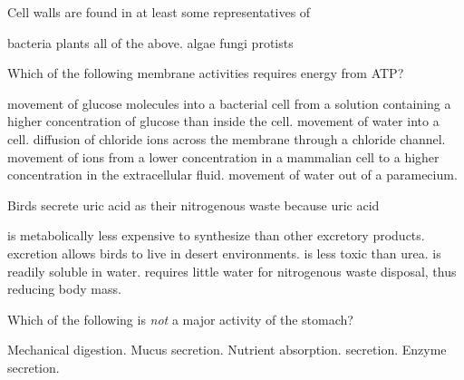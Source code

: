\question
Cell walls are found in at least some representatives of  
\begin{choices}
\choice bacteria 
\choice plants 
\correctchoice all of the above.  
\choice algae 
\choice fungi 
\choice protists 
\end{choices}

\question
Which of the following membrane activities requires energy from ATP?

\begin{choices}
\choice movement of glucose molecules into a bacterial cell from a solution containing a higher concentration of glucose than inside the cell. 
\choice movement of water into a cell. 
\choice diffusion of chloride ions across the membrane through a chloride channel. 
\correctchoice movement of  ions from a lower concentration in a mammalian cell to a higher concentration in the extracellular fluid. 
\choice movement of water out of a paramecium. 
\end{choices}

\question
Birds secrete uric acid as their nitrogenous waste because uric acid

\begin{choices}
\choice is metabolically less expensive to synthesize than other excretory products. 
\choice excretion allows birds to live in desert environments. 
\correctchoice is less toxic than urea. 
\choice is readily soluble in water. 
\correctchoice requires little water for nitrogenous waste disposal, thus reducing body mass. 
\end{choices}

\question
Which of the following is \emph{not} a major activity of the stomach?

\begin{choices}
\choice Mechanical digestion. 
\choice Mucus secretion. 
\correctchoice Nutrient absorption. 
\choice {} secretion. 
\choice Enzyme secretion. 
\end{choices}
